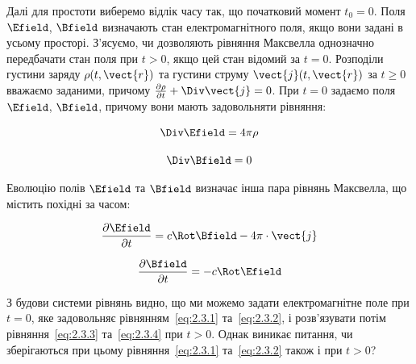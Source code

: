 Далі для простоти виберемо відлік часу так, що початковий момент \( t_0 = 0 \). Поля \( \Efield \), \( \Bfield \)
визначають стан електромагнітного поля, якщо вони задані в усьому просторі. З'ясуємо, чи дозволяють рівняння Максвелла
однозначно передбачати стан поля при \( t > 0 \), якщо цей стан відомий за \( t = 0 \). Розподіли густини заряду \(
\rho(t, \vect{r}) \) та густини струму \( \vect{j}(t, \vect{r}) \) за \( t \geqslant0 \) вважаємо заданими, причому
\(\frac{\partial\rho}{\partial t} + \Div\vect{j} = 0\). При \( t = 0 \) задаємо поля \( \Efield \), \( \Bfield \),
причому вони мають задовольняти рівняння:

\begin{equation}
	\Div \Efield = 4\pi\rho \label{eq:2.3.1}
\end{equation}

\begin{equation}
	\Div \Bfield = 0 \label{eq:2.3.2}
\end{equation}

Еволюцію полів \( \Efield \) та \( \Bfield \) визначає інша пара рівнянь Максвелла, що містить похідні за часом:

\begin{equation}
	\frac{\partial \Efield}{\partial t} = c \Rot \Bfield - 4\pi \cdot \vect{j} \label{eq:2.3.3}
\end{equation}

\begin{equation}
	\frac{\partial \Bfield}{\partial t} = -c \Rot \Efield \label{eq:2.3.4}
\end{equation}

З будови системи рівнянь видно, що ми можемо задати електромагнітне поле при \( t = 0 \), яке задовольняє
рівнянням~\eqref{eq:2.3.1} та~\eqref{eq:2.3.2}, і розв'язувати потім рівняння~\eqref{eq:2.3.3} та~\eqref{eq:2.3.4} при
\( t > 0 \). Однак виникає питання, чи зберігаються при цьому рівняння~\eqref{eq:2.3.1} та~\eqref{eq:2.3.2} також і при
\( t > 0 \)?

